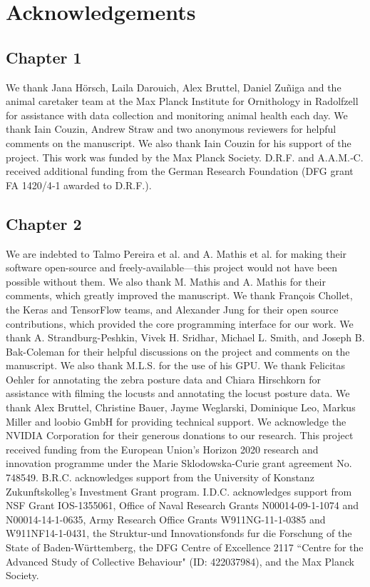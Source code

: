 \documentclass[11pt,a4paper,oneside]{book}
\begin{document}
\pagebreak
\nocite{*}



\chapter*{Acknowledgements}

\section*{Chapter 1}
We thank Jana Hörsch, Laila Darouich, Alex Bruttel, Daniel Zuñiga and the animal caretaker team at the Max Planck Institute for Ornithology in Radolfzell for assistance with data collection and monitoring animal health each day. We thank Iain Couzin, Andrew Straw and two anonymous reviewers for helpful comments on the manuscript. We also thank Iain Couzin for his support of the project. This work was funded by the Max Planck Society. D.R.F. and A.A.M.‐C. received additional funding from the German Research Foundation (DFG grant FA 1420/4‐1 awarded to D.R.F.).

\section*{Chapter 2}
We are indebted to Talmo Pereira et al. and A. Mathis et al. for making their software open-source and freely-available---this project would not have been possible without them. We also thank M. Mathis and A. Mathis for their comments, which greatly improved the manuscript. We thank Fran\c{c}ois Chollet, the Keras and TensorFlow teams, and Alexander Jung for their open source contributions, which provided the core programming interface for our work. We thank A. Strandburg-Peshkin, Vivek H. Sridhar, Michael L. Smith, and Joseph B. Bak-Coleman for their helpful discussions on the project and comments on the manuscript. We also thank M.L.S. for the use of his GPU. We thank Felicitas Oehler for annotating the zebra posture data and Chiara Hirschkorn for assistance with filming the locusts and annotating the locust posture data. We thank Alex Bruttel, Christine Bauer, Jayme Weglarski, Dominique Leo, Markus Miller and loobio GmbH for providing technical support. We acknowledge the NVIDIA Corporation for their generous donations to our research. This project received funding from the European Union's Horizon 2020 research and innovation programme under the Marie Sklodowska-Curie grant agreement No. 748549. B.R.C. acknowledges support from the University of Konstanz Zukunftskolleg's Investment Grant program. I.D.C. acknowledges support from NSF Grant IOS-1355061, Office of Naval Research Grants N00014-09-1-1074 and N00014-14-1-0635, Army Research Office Grants W911NG-11-1-0385 and W911NF14-1-0431, the Struktur-und Innovationsfonds fur die Forschung of the State of Baden-W\"urttemberg, the DFG Centre of Excellence 2117 “Centre for the Advanced Study of Collective Behaviour" (ID: 422037984), and the Max Planck Society.
\end{document}
